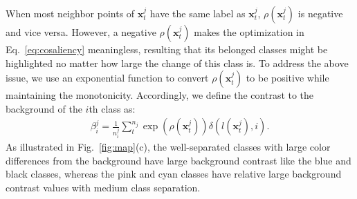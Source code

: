 When most neighbor points of $\mathbf{x}^j_t$ have the same label as $\mathbf{x}^j_t$,  $\rho (\mathbf{x}^j_t)$ is negative and vice versa.
However, a negative $\rho (\mathbf{x}^j_t)$ makes the optimization in Eq.~\ref{eq:cosaliency} meaningless, resulting that its belonged classes might be highlighted no matter how large the change of this class is.
To address the above issue, we use an exponential function to convert $\rho (\mathbf{x}^j_t)$ to be positive while maintaining the monotonicity. Accordingly, we define
the contrast to the background of the $i$th class as:
\begin{align}\label{eq:ctbc}
 \beta^j_i = \frac{1}{n^j_i}\sum^{n_j}_{t} \exp(\rho(\mathbf{x}^j_t)) \delta(l(\mathbf{x}^j_t),i).
\end{align}
As illustrated in Fig.~\ref{fig:map}(c), the well-separated classes with large color differences from the background have large background contrast like the blue and black classes, whereas the pink and cyan classes have relative large background contrast values with medium class separation.



